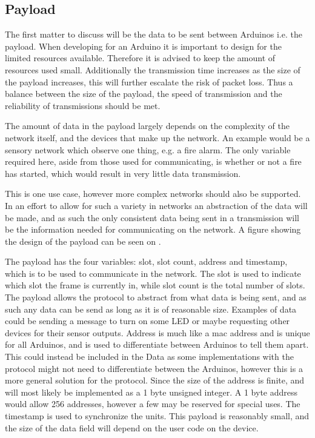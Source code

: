 \subsection{Payload}
The first matter to discuss will be the data to be sent between Arduinos i.e. the payload.
When developing for an Arduino it is important to design for the limited resources available.
Therefore it is advised to keep the amount of resources used small.
Additionally the transmission time increases as the size of the payload increases, this will further escalate the risk of packet loss. 
Thus a balance between the size of the payload, the speed of transmission and the reliability of transmissions should be met. 

\bigskip 
The amount of data in the payload largely depends on the complexity of the network itself, and the devices that make up the network.
An example would be a sensory network which observe one thing, e.g. a fire alarm. 
The only variable required here, aside from those used for communicating, is whether or not a fire has started, which would result in very little data transmission.

This is one use case, however more complex networks should also be supported. 
In an effort to allow for such a variety in networks an abstraction of the data will be made, and as such the only consistent data being sent in a transmission will be the information needed for communicating on the network.
A figure showing the design of the payload can be seen on .

\bigskip

The payload has the four variables: slot, slot count, address and timestamp, which is to be used to communicate in the network.
The slot is used to indicate which slot the frame is currently in, while slot count is the total number of slots.
The payload allows the protocol to abstract from what data is being sent, and as such any data can be send as long as it is of reasonable size. 
Examples of data could be sending a message to turn on some LED or maybe requesting other devices for their sensor outputs.
Address is much like a mac address and is unique for all Arduinos, and is used to differentiate between Arduinos to tell them apart.
This could instead be included in the Data as some implementations with the protocol might not need to differentiate between the Arduinos, however this is a more general solution for the protocol.
Since the size of the address is finite, and will most likely be implemented as a 1 byte unsigned integer. 
A 1 byte address would allow 256 addresses, however a few may be reserved for special uses.
The timestamp is used to synchronize the units.
This payload is reasonably small, and the size of the data field will depend on the user code on the device.

